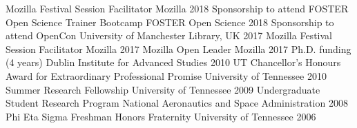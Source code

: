 \begin{cvpress}
 \cvpres
    {Mozilla Festival Session Facilitator}
    {Mozilla}
    {2018}
 \cvpres
    {Sponsorship to attend FOSTER Open Science Trainer Bootcamp}
    {FOSTER Open Science}
    {2018}
 \cvpres
    {Sponsorship to attend OpenCon}
    {University of Manchester Library, UK}
    {2017}
 \cvpres
    {Mozilla Festival Session Facilitator}
    {Mozilla}
    {2017}
 \cvpres
    {Mozilla Open Leader}
    {Mozilla}
    {2017}
  \cvpres
    {Ph.D. funding (4 years)}
    {Dublin Institute for Advanced Studies}
    {2010}
  \cvpres
    {UT Chancellor's Honours Award for Extraordinary Professional Promise}
    {University of Tennessee}
    {2010}
  \cvpres
    {Summer Research Fellowship}
    {University of Tennessee}
    {2009}
  \cvpres
    {Undergraduate Student Research Program}
    {National Aeronautics and Space Administration}
    {2008}
  \cvpres
    {Phi Eta Sigma Freshman Honors Fraternity}
    {University of Tennessee}
    {2006}
\end{cvpress}

